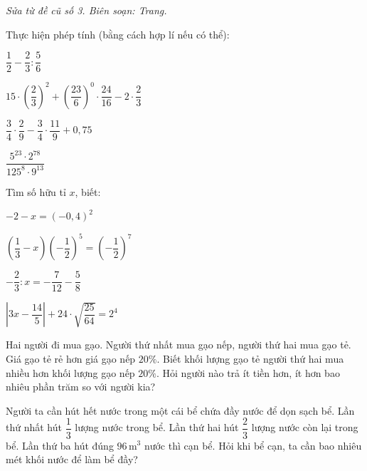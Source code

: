 \noindent\textit{Sửa từ đề cũ số 3. Biên soạn: Trang.}

\begin{bt}[2,0 điểm]
Thực hiện phép tính (bằng cách hợp lí nếu có thể):
\begin{listEX}[2]
\item $\dfrac{1}{2}-\dfrac{2}{3}:\dfrac{5}{6}$
\item $15\cdot\left(\dfrac{2}{3}\right)^{2}+\left(\dfrac{23}{6}\right)^{0}\cdot\dfrac{24}{16}-2\cdot\dfrac{2}{3}$
\item $\dfrac{3}{4}\cdot\dfrac{2}{9}-\dfrac{3}{4}\cdot\dfrac{11}{9}+0{,}75$
\item $\dfrac{5^{23}\cdot 2^{78}}{125^{8}\cdot 9^{13}}$
\end{listEX}
\end{bt}

\begin{bt}[2,0 điểm]
Tìm số hữu tỉ $x$, biết:
\begin{listEX}[2]
\item $-2-x=(-0{,}4)^{2}$
\item $\left(\dfrac{1}{3}-x\right)\left(-\dfrac{1}{2}\right)^{5}=\left(-\dfrac{1}{2}\right)^{7}$
\item $-\dfrac{2}{3}:x=-\dfrac{7}{12}-\dfrac{5}{8}$
\item $\left|3x-\dfrac{14}{5}\right|+24\cdot\sqrt{\dfrac{25}{64}}=2^{4}$
\end{listEX}
\end{bt}

\begin{bt}[1,0 điểm]
Hai người đi mua gạo. Người thứ nhất mua gạo nếp, người thứ hai mua gạo tẻ. Giá gạo tẻ rẻ hơn giá gạo nếp $20\%$. Biết khối lượng gạo tẻ người thứ hai mua nhiều hơn khối lượng gạo nếp $20\%$. Hỏi người nào trả ít tiền hơn, ít hơn bao nhiêu phần trăm so với người kia?
\end{bt}

\begin{bt}[1,0 điểm]
Người ta cần hút hết nước trong một cái bể chứa đầy nước để dọn sạch bể. Lần thứ nhất hút $\dfrac{1}{3}$ lượng nước trong bể. Lần thứ hai hút $\dfrac{2}{3}$ lượng nước còn lại trong bể. Lần thứ ba hút đúng $96\,\mathrm{m}^{3}$ nước thì cạn bể. Hỏi khi bể cạn, ta cần bao nhiêu mét khối nước để làm bể đầy?
\end{bt}

